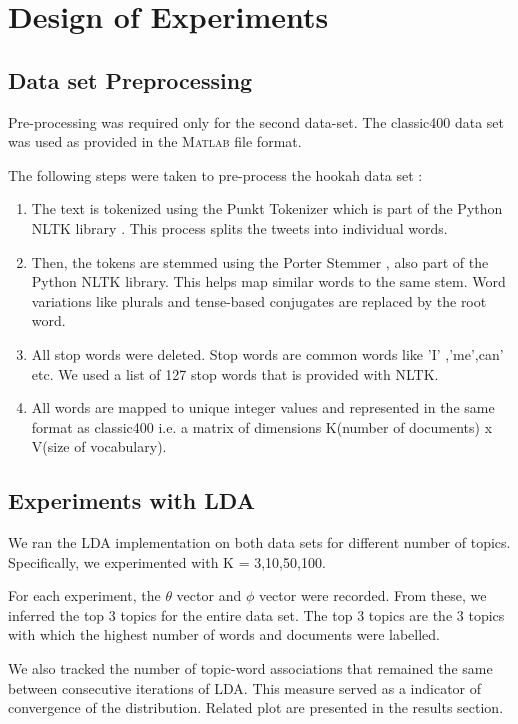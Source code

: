 \documentclass[11pt,a4paper,oneside]{article}
\begin{document}
\section{Design of Experiments}
\label{sec:Experiments}

\subsection{Data set Preprocessing}
Pre-processing was required only for the second data-set. The classic400 data set was used as provided in the \textsc{Matlab} file format.

The following steps were taken to pre-process the hookah data set : 

\begin{enumerate}
  \item The text is tokenized using the Punkt Tokenizer \cite{punkt} which is part of the Python NLTK library \cite{nltk}. This process splits the tweets into individual words.
  \item Then, the tokens are stemmed using the Porter Stemmer \cite{porter}, also part of the Python NLTK library. This helps map similar words to the same stem. Word variations like plurals and tense-based conjugates are replaced by the root word.
  \item All stop words were deleted. Stop words are common words like 'I' ,'me',can' etc. We used a list of 127 stop words that is provided with NLTK\cite{nltk}.
  \item All words are mapped to unique integer values and represented in the same format as classic400 i.e. a matrix of dimensions K(number of documents) x V(size of vocabulary).
\end{enumerate}

\subsection{Experiments with LDA}
We ran the LDA implementation on both data sets for different number of topics. Specifically, we experimented with K = 3,10,50,100. 

For each experiment, the $\theta$ vector and $\phi$ vector were recorded. From these, we inferred the top 3 topics for the entire data set. The top 3 topics are the 3 topics with which the highest number of words and documents were labelled.

We also tracked the number of topic-word associations that remained the same between consecutive iterations of LDA. This measure served as a indicator of convergence of the distribution. Related plot are presented in the results section.
\end{document}
